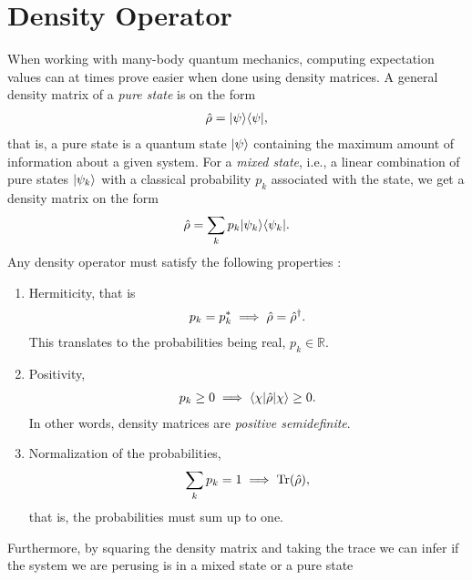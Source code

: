     \section{Density Operator}
        When working with many-body quantum mechanics, computing expectation
        values can at times prove easier when done using density matrices. A
        general density matrix of a \emph{pure state} is on the form
        \begin{align}
            \hat{\rho} = | \psi \rangle\langle \psi |,
        \end{align}
        that is, a pure state is a quantum state $| \psi \rangle$ containing the
        maximum amount of information about a given system. For a \emph{mixed
        state}, i.e., a linear combination of pure states $| \psi_k \rangle$ with a
        classical probability $p_k$ associated with the state, we get a density
        matrix on the form
        \begin{align}
            \hat{\rho} = \sum_{k} p_k | \psi_k \rangle\langle \psi_k |.
        \end{align}
        Any density operator must satisfy the following
        properties \cite{modern-qm}:
        \begin{enumerate}
            \item Hermiticity, that is
                \begin{align}
                    p_k = p_k^{*} \implies \hat{\rho} = \hat{\rho}^{\dagger}.
                \end{align}
                This translates to the probabilities being real, $p_k \in
                \mathbb{R}$.
            \item Positivity,
                \begin{align}
                    p_k \geq 0 \implies \langle \chi |\hat{\rho}| \chi \rangle \geq 0.
                \end{align}
                In other words, density matrices are \emph{positive
                semidefinite}.
            \item Normalization of the probabilities,
                \begin{align}
                    \sum_{k} p_k = 1 \implies \operatorname{Tr}(\hat{\rho}),
                \end{align}
                that is, the probabilities must sum up to one.
        \end{enumerate}
        Furthermore, by squaring the density matrix and taking the trace we can
        infer if the system we are perusing is in a mixed state or a pure state
